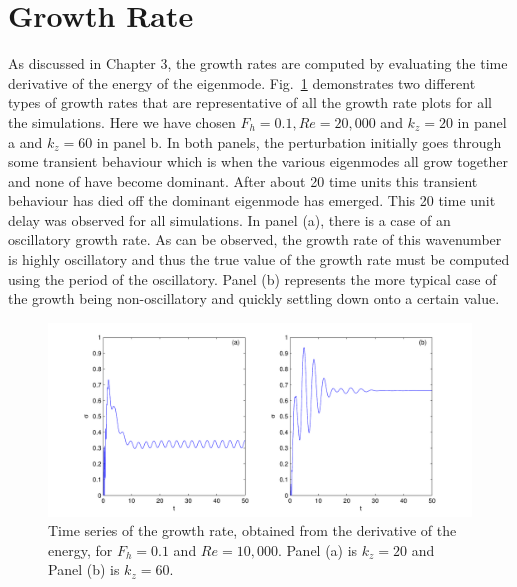 \section{Growth Rate}
As discussed in Chapter 3, the growth rates are computed by evaluating the time derivative of the energy of the eigenmode. Fig.~\ref{sigma_examples} demonstrates two different types of growth rates that are representative of all the growth rate plots for all the simulations. Here we have chosen $F_{h}=0.1, Re=20{,}000$ and $k_{z}=20$ in panel a and $k_{z}=60$ in panel b. In both panels, the perturbation initially goes through some transient behaviour which is when the various eigenmodes all grow together and none of have become dominant. After about 20 time units this transient behaviour has died off the dominant eigenmode has emerged. This 20 time unit delay was observed for all simulations. In panel (a), there is a case of an oscillatory growth rate. As can be observed, the growth rate of this wavenumber is highly oscillatory and thus the true value of the growth rate must be computed using the period of the oscillatory. Panel (b) represents the more typical case of the growth being non-oscillatory and quickly settling down onto a certain value. 
\begin{figure}
\begin{center}
\includegraphics[width=\textwidth]{sigma_examples.pdf}
\caption{Time series of the growth rate, obtained from the derivative of the energy, for $F_{h}=0.1$ and $Re=10{,}000$. Panel (a) is $k_{z}=20$ and Panel (b) is $k_{z}=60$.}
\label{sigma_examples}
\end{center}
\end{figure}

